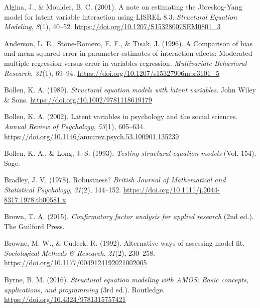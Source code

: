 \documentclass[
  man]{apa6}
\newlength{\cslhangindent}
\newenvironment{CSLReferences}[2] %
 {\begin{list}{}{%
  \setlength{\itemindent}{0pt}
  \setlength{\leftmargin}{0pt}
  \setlength{\parsep}{0pt}
  \ifodd #1
   \setlength{\leftmargin}{\cslhangindent}
   \setlength{\itemindent}{-1\cslhangindent}
  \fi
  \setlength{\itemsep}{#2\baselineskip}}}
 {\end{list}}
\begin{document}
\label{refs}
\begin{CSLReferences}{1}{0}
Algina, J., \& Moulder, B. C. (2001). A note on estimating the {J{ö}reskog-Yang} model for latent variable interaction using {LISREL} 8.3. \emph{Structural Equation Modeling}, \emph{8}(1), 40--52. \url{https://doi.org/10.1207/S15328007SEM0801_3}

Anderson, L. E., Stone-Romero, E. F., \& Tisak, J. (1996). A {Comparison} of bias and mean squared error in parameter estimates of interaction effects: {Moderated} multiple regression versus error-in-variables regression. \emph{Multivariate Behavioral Research}, \emph{31}(1), 69--94. \url{https://doi.org/10.1207/s15327906mbr3101_5}

Bollen, K. A. (1989). \emph{Structural equation models with latent variables}. John Wiley \& Sons. \url{https://doi.org/10.1002/9781118619179}

Bollen, K. A. (2002). Latent variables in psychology and the social sciences. \emph{Annual Review of Psychology}, \emph{53}(1), 605--634. \url{https://doi.org/10.1146/annurev.psych.53.100901.135239}

Bollen, K. A., \& Long, J. S. (1993). \emph{Testing structural equation models} (Vol. 154). Sage.

Bradley, J. V. (1978). Robustness? \emph{British Journal of Mathematical and Statistical Psychology}, \emph{31}(2), 144--152. \url{https://doi.org/10.1111/j.2044-8317.1978.tb00581.x}

Brown, T. A. (2015). \emph{Confirmatory factor analysis for applied research} (2nd ed.). The Guilford Press.

Browne, M. W., \& Cudeck, R. (1992). Alternative ways of assessing model fit. \emph{Sociological Methods \& Research}, \emph{21}(2), 230--258. \url{https://doi.org/10.1177/0049124192021002005}

Byrne, B. M. (2016). \emph{Structural equation modeling with {AMOS}: {Basic} concepts, applications, and programming} (3rd ed.). Routledge. \url{https://doi.org/10.4324/9781315757421}


\end{CSLReferences}
\end{document}
